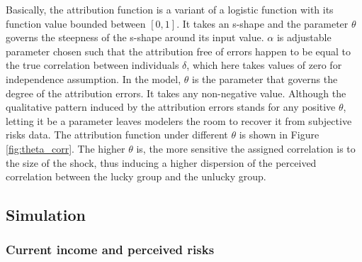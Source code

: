 \documentclass[12pt,notitlepage,onecolumn,aps,pra]{article}
\begin{document}
Basically, the attribution function is a variant of a logistic function
with its function value bounded between \([0,1]\). It takes an s-shape
and the parameter \(\theta\) governs the steepness of the s-shape around
its input value. \(\alpha\) is adjustable parameter chosen such that the
attribution free of errors happen to be equal to the true correlation
between individuals \(\delta\), which here takes values of zero for
independence assumption. In the model, \(\theta\) is the parameter that
governs the degree of the attribution errors. It takes any non-negative
value. Although the qualitative pattern induced by the attribution
errors stands for any positive \(\theta\), letting it be a parameter
leaves modelers the room to recover it from subjective risks data. The
attribution function under different \(\theta\) is shown in Figure
\ref{fig:theta_corr}. The higher \(\theta\) is, the more sensitive the
assigned correlation is to the size of the shock, thus inducing a higher
dispersion of the perceived correlation between the lucky group and the
unlucky group.


    \begin{figure*}[!ht]
        \begin{center}\end{center}
        \caption{Attribution Function}
        \label{fig:theta_corr}
    \end{figure*}
    

    \begin{figure*}[!ht]
        \begin{center}\end{center}
        \caption{Current Income and Perceived Risk}
        \label{fig:var_recent}
    \end{figure*}
    
    \hypertarget{simulation}{%
\subsection{Simulation}\label{simulation}}

\hypertarget{current-income-and-perceived-risks}{%
\subsubsection{Current income and perceived
risks}\label{current-income-and-perceived-risks}}
\end{document}
